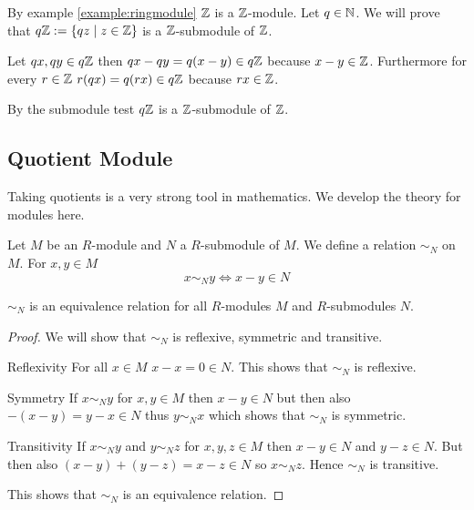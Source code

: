 \begin{example}\label{example:submodule}
	By example \ref{example:ringmodule} $\mathbb{Z}$ is a $\mathbb{Z}$-module. Let
	$q\in\mathbb{N}$. We will prove that $q\mathbb{Z} := \{qz \thickspace|\thickspace z\in \mathbb{Z}\}$ is a
	$\mathbb{Z}$-submodule of $\mathbb{Z}$. 
	
	Let $qx,qy\in q\mathbb{Z}$ then $qx-qy = q(x-y) \in q\mathbb{Z}$ because $x-y\in\mathbb{Z}$.
	Furthermore for every $r\in\mathbb{Z}$ $r(qx) = q(rx) \in q\mathbb{Z}$ because $rx \in
	\mathbb{Z}$.
	
	By the submodule test $q\mathbb{Z}$ is a $\mathbb{Z}$-submodule of $\mathbb{Z}$.
\end{example}

\subsection{Quotient Module}

Taking quotients is a very strong tool in mathematics. We develop the theory for
modules here.

\begin{definition}
	Let $M$ be an $R$-module and $N$ a $R$-submodule of $M$. We define a
	relation $\sim_{N}$ on $M$. For $x,y\in M$
	\[
		x \sim_{N} y \Leftrightarrow x-y \in N
	\]
\end{definition}

\begin{proposition}
	$\sim_{N}$ is an equivalence relation for all $R$-modules $M$ and
	$R$-submodules $N$.
\end{proposition}

\begin{proof}
	We will show that $\sim_{N}$ is reflexive, symmetric and transitive.
	\begin{namedlist}[Transitivity]
		\item[Reflexivity] For all $x\in M$ $x-x = 0 \in N$. This shows
		that $\sim_{N}$ is reflexive.
		
		\item[Symmetry] If $x\sim_{N} y$ for $x,y\in M$ then $x-y\in N$
		but then also $-(x-y) = y-x \in N$ thus $y\sim_{N} x$ which shows
		that $\sim_{N}$ is symmetric.
		
		\item[Transitivity] If $x\sim_{N} y$ and $y\sim_{N} z$ for
		$x,y,z\in M$ then $x-y\in N$ and $y-z\in N$. But then also
		$(x-y) + (y-z) = x-z \in N$ so $x\sim_{N} z$. Hence $\sim_{N}$
		is transitive.
	\end{namedlist}
	
	This shows that $\sim_{N}$ is an equivalence relation.
\end{proof}

